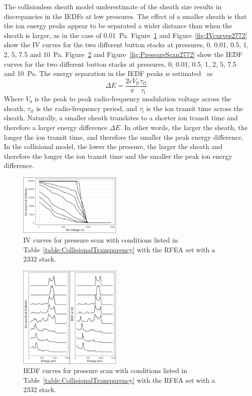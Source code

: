 The collisionless sheath model underestimate of the sheath size results in discrepancies in the IEDFs at low pressures. The effect of a smaller sheath is that the ion energy peaks appear to be separated a wider distance than when the sheath is larger, as in the case of 0.01~Pa. Figure~\ref{fig:IVcurves2332} and Figure~\ref{fig:IVcurves2772} show the IV curves for the two different button stacks at pressures, 0, 0.01, 0.5, 1, 2, 5, 7.5 and 10~Pa. Figure~\ref{fig:PressureScan2332} and Figure~\ref{fig:PressureScan2772} show the IEDF curves for the two different button stacks at pressures, 0, 0.01, 0.5, 1, 2, 5, 7.5 and 10~Pa. The energy separation in the IEDF peaks is estimated~\cite{Gahan2008} as 
\begin{equation}
\Delta E = \frac{2 e V_0}{ \pi } \frac{ \tau_\text{rf} }{ \tau_\text{i} }
\end{equation} 
Where $V_0$ is the peak to peak radio-frequency modulation voltage across the sheath, $\tau_\text{rf}$ is the radio-frequency period, and $\tau_\text{i}$ is the ion transit time across the sheath. Naturally, a smaller sheath translates to a shorter ion transit time and therefore a larger energy difference $\Delta E$. In other words, the larger the sheath, the longer the ion transit time, and therefore the smaller the peak energy difference. In the collisional model, the lower the pressure, the larger the sheath and therefore the longer the ion transit time and the smaller the peak ion energy difference.  

\begin{figure}[htbp]
\centering
\includegraphics[width=0.45\textwidth]{Figures/IVcurve2332.jpeg}
\caption{IV curves for pressure scan with conditions listed in Table~\ref{table:CollisionalTransparency} with the RFEA set with a 2332 stack.}
\label{fig:IVcurves2332}
\end{figure}

\begin{figure}[htbp]
\centering
\includegraphics[width=0.45\textwidth]{Figures/PressureScan2332.jpeg}
\caption{IEDF curves for pressure scan with conditions listed in Table~\ref{table:CollisionalTransparency} with the RFEA set with a 2332 stack.}
\label{fig:PressureScan2332}
\end{figure}

